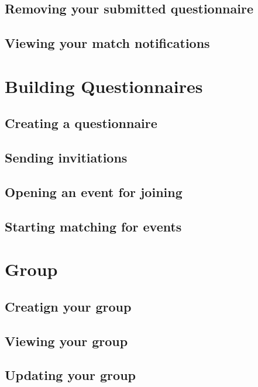 \documentclass[a4paper,11pt,titlepage]{scrartcl}
\begin{document}
\subsection{Removing your submitted questionnaire}

\subsection{Viewing your match notifications}


\clearpage
\section{Building Questionnaires}

\subsection{Creating a questionnaire}

\subsection{Sending invitiations}

\subsection{Opening an event for joining}

\subsection{Starting matching for events}

\clearpage
\section{Group}

\subsection{Creatign your group}

\subsection{Viewing your group}

\subsection{Updating your group}
\end{document}
